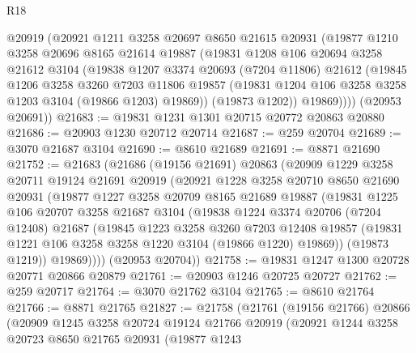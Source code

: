 \begin{lexlean}{R18}
\begin{coremodule}
        @20919
        (@20921
          @1211
          @3258
          @20697
          @8650
          @21615
          @20931
          (@19877
            @1210
            @3258
            @20696
            @8165
            @21614
            @19887
            (@19831
              @1208
              @106
              @20694
              @3258
              @21612
              @3104
              (@19838
                @1207
                @3374
                @20693
                (@7204 @11806)
                @21612
                (@19845
                  @1206
                  @3258
                  @3260
                  @7203
                  @11806
                  @19857
                  (@19831 @1204 @106 @3258 @3258 @1203 @3104 (@19866 @1203) @19869))
                (@19873 @1202))
              @19869))))
      (@20953 @20691))
@21683 := @19831 @1231 @1301 @20715 @20772 @20863 @20880
@21686 := @20903 @1230 @20712 @20714
@21687 := @259 @20704
@21689 := @3070 @21687 @3104
@21690 := @8610 @21689
@21691 := @8871 @21690
@21752 := @21683
    (@21686
      (@19156 @21691)
      @20863
      (@20909
        @1229
        @3258
        @20711
        @19124
        @21691
        @20919
        (@20921
          @1228
          @3258
          @20710
          @8650
          @21690
          @20931
          (@19877
            @1227
            @3258
            @20709
            @8165
            @21689
            @19887
            (@19831
              @1225
              @106
              @20707
              @3258
              @21687
              @3104
              (@19838
                @1224
                @3374
                @20706
                (@7204 @12408)
                @21687
                (@19845
                  @1223
                  @3258
                  @3260
                  @7203
                  @12408
                  @19857
                  (@19831 @1221 @106 @3258 @3258 @1220 @3104 (@19866 @1220) @19869))
                (@19873 @1219))
              @19869))))
      (@20953 @20704))
@21758 := @19831 @1247 @1300 @20728 @20771 @20866 @20879
@21761 := @20903 @1246 @20725 @20727
@21762 := @259 @20717
@21764 := @3070 @21762 @3104
@21765 := @8610 @21764
@21766 := @8871 @21765
@21827 := @21758
    (@21761
      (@19156 @21766)
      @20866
      (@20909
        @1245
        @3258
        @20724
        @19124
        @21766
        @20919
        (@20921
          @1244
          @3258
          @20723
          @8650
          @21765
          @20931
          (@19877
            @1243

\end{coremodule}
\end{lexlean}
